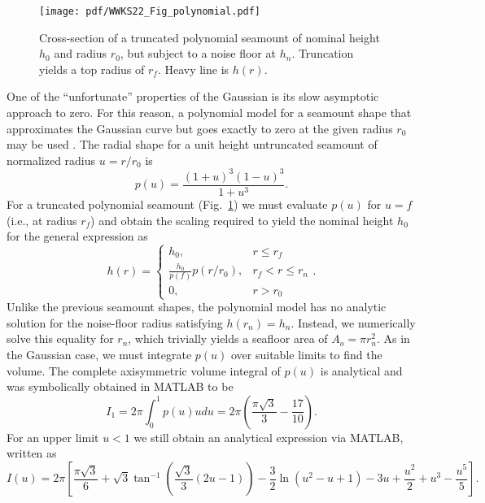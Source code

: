 \begin{figure}
\centering
\texttt{[image: pdf/WWKS22\_Fig\_polynomial.pdf]}
\caption{Cross-section of a truncated polynomial seamount of nominal height $h_0$ and radius
$r_0$, but subject to a noise floor at $h_n$.  Truncation yields a top radius of $r_f$. Heavy line is $h(r)$.}
\label{WWKS22_Fig_polynomial}
\end{figure}
One of the ``unfortunate'' properties of the Gaussian is its slow asymptotic approach to zero. For this reason,
a polynomial model for a seamount shape that approximates the Gaussian curve but goes exactly to zero at the
given radius $r_0$ may be used \citep[e.g.,~][]{KW2011}.  The radial shape for a unit height untruncated seamount
of normalized radius $u = r/r_0$ is
\begin{equation*}
	p(u) = \frac{(1+u)^3(1-u)^3}{1+u^3}.
\end{equation*}
For a truncated polynomial seamount (Fig.~\ref{WWKS22_Fig_polynomial}) we must evaluate $p(u)$ for $u = f$ (i.e., at radius $r_f$)
and obtain the scaling required to yield the nominal height $h_0$ for the general expression as
\begin{equation*}
h(r) = \left \{ \begin{array}{cl} 
	h_0, & r \leq r_f \\
	\frac{h_0}{p(f)} p(r/r_0), & r_f < r \leq r_n \\
	0, & r > r_0
\end{array} \right..
\end{equation*}
Unlike the previous seamount shapes, the polynomial model has no analytic solution for the noise-floor
radius satisfying $h(r_n) = h_n$.  Instead, we numerically solve this equality for $r_n$, which
trivially yields a seafloor area of $A_o = \pi r_n^2$.
As in the Gaussian case, we must integrate $p(u)$ over suitable limits to find the volume.
The complete axisymmetric volume integral of $p(u)$ is analytical and was symbolically obtained
in MATLAB to be
\begin{equation*}
I_1 = 2\pi\int_0^1 p(u) udu = 2 \pi \left (\frac{\pi \sqrt{3}}{3} - \frac{17}{10} \right ).
\end{equation*}
For an upper limit $u < 1$ we still obtain an analytical expression via MATLAB, written as
\begin{equation*}
	I(u) = 2\pi \left [ \frac{\pi \sqrt{3}}{6} + \sqrt{3} \tan^{-1} \left( \frac{\sqrt{3}}{3}(2u - 1) \right ) - \frac{3}{2}\ln (u^2 - u + 1) - 3u + \frac{u^2}{2} + u^3 - \frac{u^5}{5} \right ].
\end{equation*}

